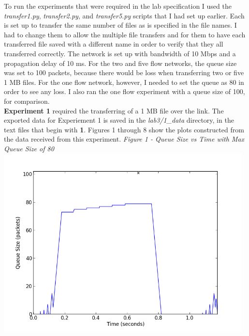 \documentclass[11pt]{article}
\begin{document}
To run the experiments that were required in the lab specification I used the \textit{transfer1.py}, \textit{transfer2.py}, and \textit{transfer5.py} scripts that I had set up earlier. Each is set up to transfer the same number of files as is specified in the file names. I had to change them to allow the multiple file transfers and for them to have each transferred file saved with a different name in order to verify that they all transferred correctly. The network is set up with bandwidth of 10 Mbps and a propagation delay of 10 ms. For the two and five flow networks, the queue size was set to 100 packets, because there would be loss when transferring two or five 1 MB files. For the one flow network, however, I needed to set the queue as 80 in order to see any loss.  I also ran the one flow experiment with a queue size of 100, for comparison.
\\
\textbf{Experiment 1} required the transferring of a 1 MB file over the link. The exported data for Experiement 1 is saved in the \textit{lab3/1\_data} directory, in the text files that begin with \textbf{1\-}. Figures 1 through 8 show the plots constructed from the data received from this experiment.
\vspace{0.25cm}
\textit{Figure 1 - Queue Size vs Time with Max Queue Size of 80}
\\
\includegraphics[width=13cm]{1_data/1-queue_q80}
\vspace{0.25cm}
\end{document}
